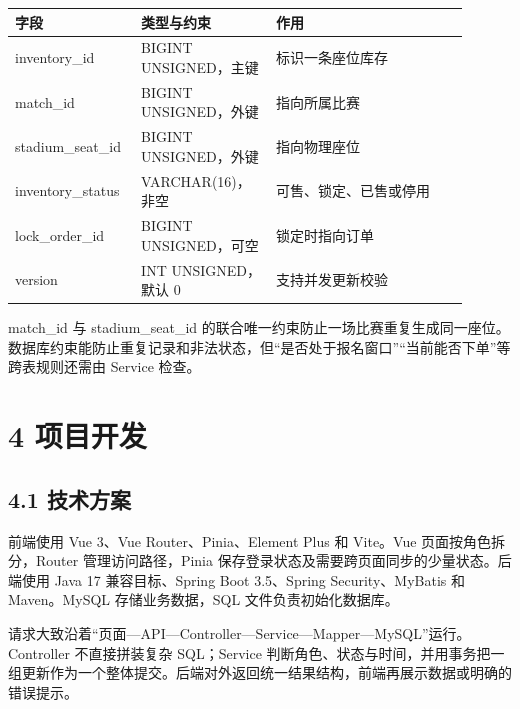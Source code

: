 \documentclass[UTF8,zihao=-4,a4paper]{ctexart}
\begin{document}
\begin{longtable}{@{}>{\raggedright\arraybackslash}p{0.22\linewidth}>{\raggedright\arraybackslash}p{0.28\linewidth}>{\raggedright\arraybackslash}p{0.4\linewidth}@{}}\toprule

\textbf{字段} & \textbf{类型与约束} & \textbf{作用} \\\midrule

inventory\_\allowbreak{}id & BIGINT UNSIGNED，主键 & 标识一条座位库存 \\

match\_\allowbreak{}id & BIGINT UNSIGNED，外键 & 指向所属比赛 \\

stadium\_\allowbreak{}seat\_\allowbreak{}id & BIGINT UNSIGNED，外键 & 指向物理座位 \\

inventory\_\allowbreak{}status & VARCHAR(16)，非空 & 可售、锁定、已售或停用 \\

lock\_\allowbreak{}order\_\allowbreak{}id & BIGINT UNSIGNED，可空 & 锁定时指向订单 \\

version & INT UNSIGNED，默认 0 & 支持并发更新校验 \\

\bottomrule\end{longtable}

match\_\allowbreak{}id 与 stadium\_\allowbreak{}seat\_\allowbreak{}id 的联合唯一约束防止一场比赛重复生成同一座位。数据库约束能防止重复记录和非法状态，但“是否处于报名窗口”“当前能否下单”等跨表规则还需由 Service 检查。


\section*{4 项目开发}

\subsection*{4.1 技术方案}

前端使用 Vue 3、Vue Router、Pinia、Element Plus 和 Vite。Vue 页面按角色拆分，Router 管理访问路径，Pinia 保存登录状态及需要跨页面同步的少量状态。后端使用 Java 17 兼容目标、Spring Boot 3.5、Spring Security、MyBatis 和 Maven。MySQL 存储业务数据，SQL 文件负责初始化数据库。


请求大致沿着“页面—API—Controller—Service—Mapper—MySQL”运行。Controller 不直接拼装复杂 SQL；Service 判断角色、状态与时间，并用事务把一组更新作为一个整体提交。后端对外返回统一结果结构，前端再展示数据或明确的错误提示。
\end{document}
